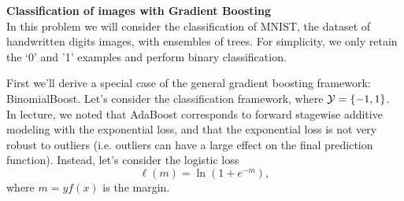 \documentclass{article}
\newcommand{\nyuparagraph}[1]{\vspace{0.3cm}\textcolor{nyupurple}{\bf \large #1}\\}
\theoremstyle{plain}
\theoremstyle{definition}
\begin{document}
\nyuparagraph{Classification of images with Gradient Boosting}
In this problem we will consider the classification of MNIST, the dataset of handwritten digits images, with ensembles of trees. For simplicity, we only retain the `0' and '1' examples and perform binary classification.

First we'll derive a special case of the general gradient
boosting framework: BinomialBoost. 
Let's consider the classification framework, where $\mathcal{Y}=\left\{ -1,1\right\} $.
In lecture, we noted that AdaBoost corresponds to forward stagewise
additive modeling with the exponential loss, and that the exponential
loss is not very robust to outliers (i.e. outliers can have a large
effect on the final prediction function). Instead, let's consider
the logistic loss 
\[
\ell(m)=\ln\left(1+e^{-m}\right),
\]
where $m=yf(x)$ is the margin.
\end{document}
